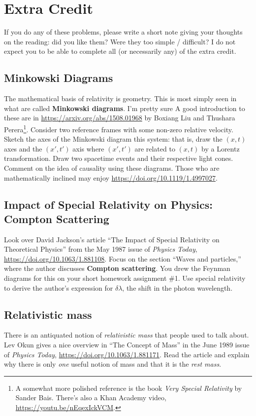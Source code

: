 \documentclass[12pt]{article}
\numberwithin{equation}{section}    %
\begin{document}
\section{Extra Credit}

If you do any of these problems, please write a short note giving your thoughts on the reading: did you like them? Were they too simple / difficult? I do not expect you to be able to complete all (or necessarily any) of the extra credit.

\subsection{Minkowski Diagrams}

The mathematical basis of relativity is geometry. This is most simply seen in what are called \textbf{Minkowski diagrams}. I'm pretty sure  A good introduction to these are in \url{https://arxiv.org/abs/1508.01968} by Boxiang Liu and Thushara Perera\footnote{A somewhat more polished reference is the book \emph{Very Special Relativity} by Sander Bais. There's also a Khan Academy video, \url{https://youtu.be/nEqexIckVCM}.}. Consider two reference frames with some non-zero relative velocity. Sketch the axes of the Minkowski diagram this system: that is, draw the $(x,t)$ axes and the $(x',t')$ axis where $(x',t')$ are related to $(x,t)$ by a Lorentz transformation.  Draw two spacetime events and their respective light cones. Comment on the idea of causality using these diagrams. Those who are mathematically inclined may enjoy \url{https://doi.org/10.1119/1.4997027}. 

\subsection{Impact of Special Relativity on Physics: Compton Scattering}

Look over David Jackson's article ``The Impact of Special Relativity on Theoretical Physics'' from the May 1987 issue of \emph{Physics Today}, \url{https://doi.org/10.1063/1.881108}. Focus on the section ``Waves and particles,'' where the author discusses \textbf{Compton scattering}. You drew the Feynman diagrams for this on your short homework assignment \#1. Use special relativity to derive the author's expression for $\delta\lambda$, the shift in the photon wavelength.

\subsection{Relativistic mass}

There is an antiquated notion of \emph{relativistic mass} that people used to talk about. Lev Okun gives a nice overview in ``The Concept of Mass'' in the June 1989 issue of \emph{Physics Today}, \url{https://doi.org/10.1063/1.881171}. Read the article and explain why there is only \emph{one} useful notion of mass and that it is the \emph{rest mass}.
\end{document}
